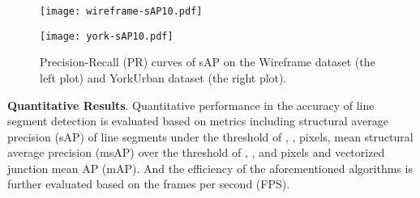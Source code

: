\documentclass[letterpaper, 10 pt, conference]{ieeeconf}
\begin{document}
\begin{table}[h]
	\caption{{\color{black}Quantitative results and comparisons on the Wireframe dataset and YorkUrban dataset.}}
	\centering
	\label{tab:1}
\end{table} 
\begin{figure}[h!] 
	\centering
	\begin{minipage}[t]{0.49\linewidth}
		\centering
		\texttt{[image: wireframe-sAP10.pdf]} 
		\label{fig:5a}
	\end{minipage}
	\begin{minipage}[t]{0.49\linewidth}
		\centering
		\texttt{[image: york-sAP10.pdf]}
		\label{fig:5b}
	\end{minipage}
	\caption{Precision-Recall (PR) curves of sAP on the Wireframe dataset (the left plot) and YorkUrban dataset (the right plot).}
	\label{fig:5}
\end{figure}
\noindent \textbf{Quantitative Results}. Quantitative performance in the accuracy of line segment detection is evaluated based on metrics including structural average precision (sAP) of line segments under the threshold of , ,  pixels, mean structural average precision (msAP) over the threshold of , , and  pixels and vectorized junction mean AP (mAP). And the efficiency of the aforementioned algorithms is further evaluated based on the frames per second (FPS). 
\end{document}
